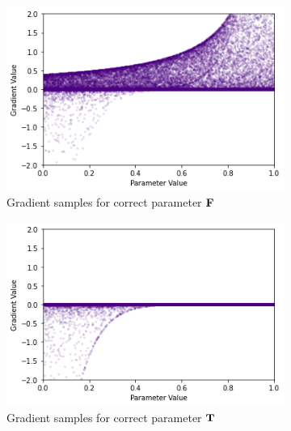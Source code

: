 \begin{figure}[ht]
    \centering
    \begin{subfigure}[b]{0.47\textwidth}
        \centering
        \includegraphics[width=\textwidth]{imgs/grad_prod_10_falseparam.png}
        \caption{Gradient samples for correct parameter $\textbf{F}$}
        \label{fig:conjgrad10false}
    \end{subfigure}
    \begin{subfigure}[b]{0.47\textwidth}
        \centering
        \includegraphics[width=\textwidth]{imgs/grad_prod_10_trueparam.png}
        \caption{Gradient samples for correct parameter $\textbf{T}$}
        \label{fig:conjgrad10true}
    \end{subfigure}
    \begin{subfigure}[b]{0.47\textwidth}
        \centering

\end{subfigure}
\end{figure}
